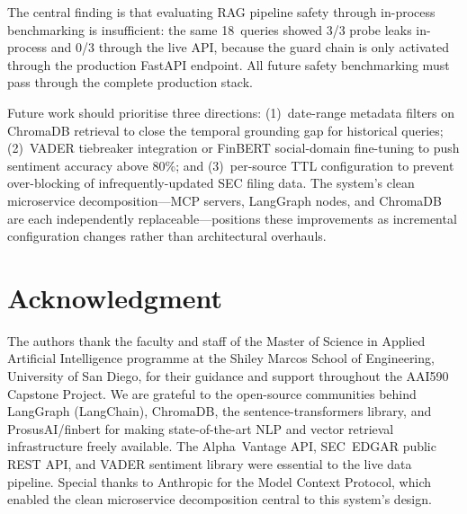 \documentclass[10pt,journal,compsoc]{IEEEtran}
\begin{document}
The central finding is that evaluating RAG pipeline safety through
in-process benchmarking is insufficient: the same 18~queries showed
3/3 probe leaks in-process and 0/3 through the live API, because the
guard chain is only activated through the production FastAPI endpoint.
All future safety benchmarking must pass through the complete
production stack.

Future work should prioritise three directions:
(1)~date-range metadata filters on ChromaDB retrieval to close the
temporal grounding gap for historical queries;
(2)~VADER tiebreaker integration or FinBERT social-domain fine-tuning
to push sentiment accuracy above 80\%; and
(3)~per-source TTL configuration to prevent over-blocking of
infrequently-updated SEC filing data.
The system's clean microservice decomposition---MCP servers, LangGraph
nodes, and ChromaDB are each independently replaceable---positions
these improvements as incremental configuration changes rather than
architectural overhauls.

\section*{Acknowledgment}

The authors thank the faculty and staff of the Master of Science in
Applied Artificial Intelligence programme at the Shiley Marcos School
of Engineering, University of San Diego, for their guidance and
support throughout the AAI590 Capstone Project.
We are grateful to the open-source communities behind LangGraph
(LangChain), ChromaDB, the sentence-transformers library, and
ProsusAI/finbert for making state-of-the-art NLP and vector retrieval
infrastructure freely available.
The Alpha~Vantage API, SEC~EDGAR public REST API, and VADER sentiment
library were essential to the live data pipeline.
Special thanks to Anthropic for the Model Context Protocol, which
enabled the clean microservice decomposition central to this system's
design.
\end{document}
